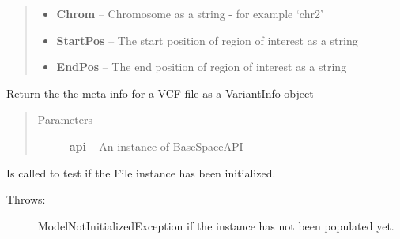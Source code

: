 \documentclass[letterpaper,10pt,english]{sphinxmanual}
\begin{document}
\begin{fulllineitems}
\begin{fulllineitems}
\begin{quote}
\begin{description}
\begin{itemize}
\item {} 
\textbf{Chrom} -- Chromosome as a string - for example `chr2'

\item {} 
\textbf{StartPos} -- The start position of region of interest as a string

\item {} 
\textbf{EndPos} -- The end position of region of interest as a string

\end{itemize}

\end{description}\end{quote}

\end{fulllineitems}


\begin{fulllineitems}
\label{Available modules:BaseSpacePy.model.File.File.getVariantMeta}
Return the the meta info for a VCF file as a VariantInfo object
\begin{quote}\begin{description}
\item[{Parameters}] \leavevmode
\textbf{api} -- An instance of BaseSpaceAPI

\end{description}\end{quote}

\end{fulllineitems}


\begin{fulllineitems}
\label{Available modules:BaseSpacePy.model.File.File.isInit}
Is called to test if the File instance has been initialized.
\begin{description}
\item[{Throws:}] \leavevmode
ModelNotInitializedException if the instance has not been populated yet.

\end{description}

\end{fulllineitems}



\end{fulllineitems}
\end{document}
